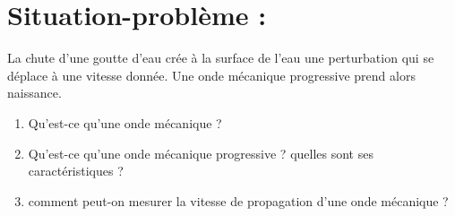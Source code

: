 \documentclass[12pt]{article}
\begin{document}
\section*{Situation-problème :}
La chute d’une goutte d’eau crée à la surface de l’eau une perturbation qui se déplace à une vitesse donnée. Une onde mécanique progressive prend alors naissance.

\begin{enumerate}
\item Qu’est-ce qu’une onde mécanique ?
\item Qu’est-ce qu’une onde mécanique progressive ? quelles sont ses caractéristiques ?
\item comment peut-on mesurer la vitesse de propagation
d’une onde mécanique ?
\end{enumerate}
\end{document}
